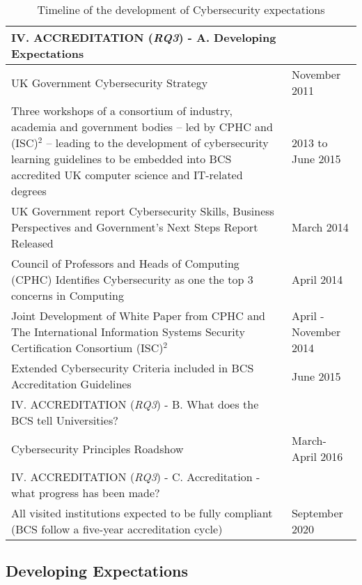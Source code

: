\documentclass[conference]{IEEEtran}
\begin{document}
{%
  \begin{table}[h!]
  \caption{Timeline of the development of Cybersecurity expectations}
  \label{table:1}
  \begin{tabular}{ | p{6cm} |p{1.5cm} |}
    \hline
    IV. ACCREDITATION ({\emph{RQ3}}) - A. Developing Expectations &  \\ \hline
    UK Government Cybersecurity Strategy \cite{ukcyberstrategy:2016} & November 2011 \\ \hline
    Three workshops of a consortium of industry, academia and government bodies -- led by CPHC and  (ISC)$^2$ -- leading to the development of cybersecurity learning guidelines to be embedded into BCS accredited UK computer science and IT-related degrees~\cite{CPHCISC2}  & 2013 to June 2015 \\ \hline
    UK Government report Cybersecurity Skills, Business Perspectives and Government's Next Steps Report Released \cite{UKCabinetOffice2014} & March 2014  \\ \hline
    Council of Professors and Heads of Computing (CPHC) Identifies Cybersecurity as one the top 3 concerns in Computing & April 2014 \\ \hline
    Joint Development of White Paper from CPHC and The International Information Systems Security Certification Consortium (ISC)$^2$ \cite{CPHCISC2014} & April -November 2014 \\ \hline
    Extended Cybersecurity Criteria included in BCS Accreditation Guidelines \cite{BCS2018a}& June 2015 \\
    \hline
    IV. ACCREDITATION ({\emph{RQ3}}) - B. What does the BCS tell Universities? & \\ \hline
    Cybersecurity Principles Roadshow & March-April 2016 \\ \hline
    IV. ACCREDITATION ({\emph{RQ3}}) - C. Accreditation - what progress has been made? &  \\ \hline
    All visited institutions expected to be fully compliant 
 (BCS follow a five-year accreditation cycle)  & September 2020\\ \hline
  \end{tabular}
  \end{table}

\subsection{Developing Expectations}

}
\end{document}
